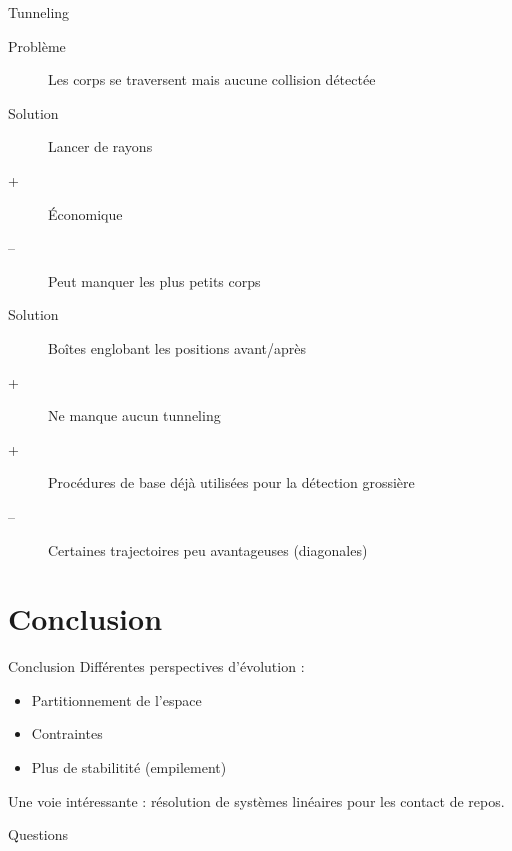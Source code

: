 \documentclass{beamer}
\begin{document}
\begin{frame}{Tunneling}
  \begin{description}
    \item[Problème]
      Les corps se traversent mais aucune collision détectée
  \end{description}

  \vfill

  \begin{overprint}

    \begin{figure}
      \centering
      
    \end{figure}

    \begin{figure}
      \centering
      
    \end{figure}
    \vfill
    \begin{description}
    \item[Solution] Lancer de rayons
    \item[+] \'Economique
    \item[--] Peut manquer les plus petits corps
    \end{description}

    \begin{figure}
      \centering
      
    \end{figure}
    \vfill
    \begin{description}
    \item[Solution] Boîtes englobant les positions avant/après
    \item[+] Ne manque aucun tunneling
    \item[+] Procédures de base déjà utilisées pour la détection grossière
    \item[--] Certaines trajectoires peu avantageuses (diagonales)
    \end{description}

  \end{overprint}
\end{frame}

\section{Conclusion}

\begin{frame}{Conclusion}
  Différentes perspectives d'évolution :
  \begin{itemize}
    \item Partitionnement de l'espace
    \item Contraintes
    \item Plus de stabilitité (empilement)
  \end{itemize}

  \vfill

  Une voie intéressante : résolution de systèmes linéaires pour les contact de repos.
\end{frame}

\begin{frame}
  \begin{center}
    \Huge{Questions}
  \end{center}
\end{frame}
\end{document}
